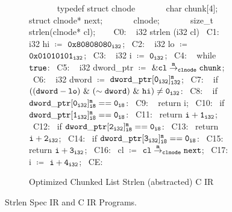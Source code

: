 \begin{figure}[htpb]
\begin{minipage}[c]{0.50\textwidth}
\begin{subfigure}[b]{1\textwidth}
\begin{center}
\begin{allLangEnvScript}
~{\tiny \textcolor{mygray}{\ \ \ \ }}~ typedef struct clnode {
~{\tiny \textcolor{mygray}{\ \ \ \ }}~ char chunk[4]; struct clnode* next;
~{\tiny \textcolor{mygray}{\ \ \ \ }}~ } clnode;
~{\tiny \textcolor{mygray}{\ \ \ \ }}~ size_t strlen(clnode* cl);
~{\tiny \textcolor{mygray}{}}~
~{\tiny \textcolor{mygray}{C0: }}~ i32 strlen (i32 cl) {
~{\tiny \textcolor{mygray}{C1: }}~   i32 hi $\coloneq$ $\mathrm{\tt 0x80808080_{i32}}$;
~{\tiny \textcolor{mygray}{C2: }}~   i32 lo $\coloneq$ $\mathrm{\tt 0x01010101_{i32}}$;
~{\tiny \textcolor{mygray}{C3: }}~   i32 i  $\coloneq$ $\mathrm{\tt 0_{i32}}$;
~{\tiny \textcolor{mygray}{C4: }}~   while ${\tt true}$:
~{\tiny \textcolor{mygray}{C5: }}~     i32 dword_ptr $\coloneq$ ${\tt \& {\tt \tt cl} \overset{m}{\rightarrow}_{\tt clnode} {\tt chunk}}$;
~{\tiny \textcolor{mygray}{C6: }}~     i32 dword     $\coloneq$ $\mathrm{\tt dword\_ptr[0_{i32}]^m_{i32}}$;
~{\tiny \textcolor{mygray}{C7: }}~     if $\mathrm{\tt ((dword - lo)\ \&\ (\sim dword)\ \&\ hi) \neq 0_{i32}}$:
~{\tiny \textcolor{mygray}{C8: }}~       if $\mathrm{\tt dword\_ptr[0_{i32}]^m_{i8} == 0_{i8}}$:
~{\tiny \textcolor{mygray}{C9: }}~         return i;
~{\tiny \textcolor{mygray}{C10:}}~       if $\mathrm{\tt dword\_ptr[1_{i32}]^m_{i8} == 0_{i8}}$:
~{\tiny \textcolor{mygray}{C11:}}~         return $\mathrm{\tt i + 1_{i32}}$;
~{\tiny \textcolor{mygray}{C12:}}~       if $\mathrm{\tt dword\_ptr[2_{i32}]^m_{i8} == 0_{i8}}$:
~{\tiny \textcolor{mygray}{C13:}}~         return $\mathrm{\tt i + 2_{i32}}$;
~{\tiny \textcolor{mygray}{C14:}}~       if $\mathrm{\tt dword\_ptr[3_{i32}]^m_{i8} == 0_{i8}}$:
~{\tiny \textcolor{mygray}{C15:}}~         return $\mathrm{\tt i + 3_{i32}}$;
~{\tiny \textcolor{mygray}{C16:}}~     cl $\coloneq$ $\mathrm{\tt {\tt \tt cl} \overset{m}{\rightarrow}_{\tt clnode} {\tt next}}$;
~{\tiny \textcolor{mygray}{C17:}}~     i  $\coloneq$ $\mathrm{\tt i + 4_{i32}}$;
~{\tiny \textcolor{mygray}{CE: }}~ }
\end{allLangEnvScript}
\end{center}
\caption{\label{fig:llStrlenCClistIR}Optimized Chunked List Strlen (abstracted) C IR}
\end{subfigure}%
\end{minipage}
\vspace{-5px}
\caption{\label{fig:strlenSpecAndC} Strlen Spec IR and C IR Programs.}
\vspace{-5px}
\end{figure}

